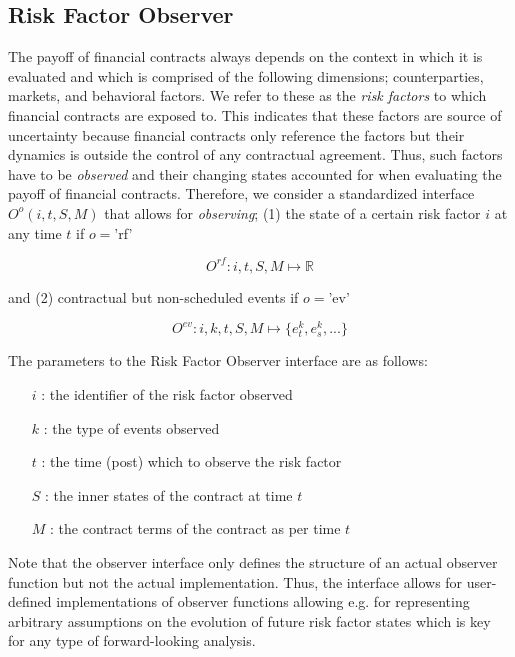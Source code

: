 \documentclass[9pt,oneside]{amsart}
\newcommand{\Real}{\mathbb{R}}
\newcommand{\obsfull}[5]{O^{#1}(#2,#3,#4,#5)}
\newcommand{\obsfunc}[1]{O^{#1}}
\begin{document}
\begin{multicols}{2}

\section{Risk Factor Observer}\label{sec:rfobserver}

The payoff of financial contracts always depends on the context in which it is evaluated and which is comprised of the following dimensions; counterparties, markets, and behavioral factors. We refer to these as the \textit{risk factors} to which financial contracts are exposed to. This indicates that these factors are source of uncertainty because financial contracts only reference the factors but their dynamics is outside the control of any contractual agreement. Thus, such factors have to be \textit{observed} and their changing states accounted for when evaluating the payoff of financial contracts. Therefore, we consider a standardized interface $\obsfull{o}{i}{t}{S}{M}$ that allows for \textit{observing}; (1) the state of a certain risk factor $i$ at any time $t$ if $o=$'rf'

\[
	\obsfunc{rf}: i,t,S,M \mapsto \Real
\]

and (2) contractual but non-scheduled events if $o=$'ev'

\[
	\obsfunc{ev}: i,k,t,S,M \mapsto \{e_t^{k},e_s^{k},...\}
\]

The parameters to the Risk Factor Observer interface are as follows:

\begin{itemize}
	\item[$i$]: the identifier of the risk factor observed

	\item[$k$]: the type of events observed

	\item[$t$]: the time (post) which to observe the risk factor

	\item [$S$]: the inner states of the contract at time $t$

	\item [$M$]: the contract terms of the contract as per time $t$
\end{itemize}

Note that the observer interface only defines the structure of an actual observer function but not the actual implementation. Thus, the interface allows for user-defined implementations of observer functions allowing e.g. for representing arbitrary assumptions on the evolution of future risk factor states which is key for any type of forward-looking analysis.


\end{multicols}
\end{document}
